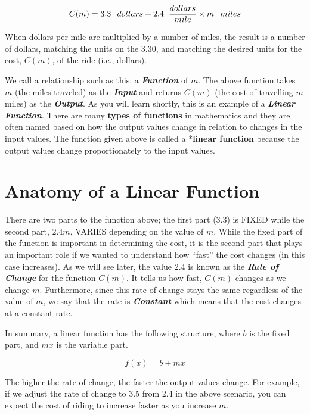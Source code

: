 \documentclass[
  letterpaper,
  DIV=11,
  numbers=noendperiod]{scrreprt}
\begin{document}
\[C(m)=3.3 \hspace{.1in} dollars + 2.4 \hspace{.08in} \frac{dollars}{mile} \times m\hspace{.1in} miles\]

When dollars per mile are multiplied by a number of miles, the result is
a number of dollars, matching the units on the 3.30, and matching the
desired units for the cost, \(C(m)\), of the ride (i.e., dollars).

We call a relationship such as this, a \textbf{\emph{Function}} of
\(m\). The above function takes \(m\) (the miles traveled) as the
\textbf{\emph{Input}} and returns \(C(m)\) (the cost of travelling \(m\)
miles) as the \textbf{\emph{Output}}. As you will learn shortly, this is
an example of a \textbf{\emph{Linear Function}}. There are many
\textbf{types of functions} in mathematics and they are often named
based on how the output values change in relation to changes in the
input values. The function given above is called a *\textbf{linear
function} because the output values change proportionately to the input
values.

\hypertarget{anatomy-of-a-linear-function}{%
\section{Anatomy of a Linear
Function}\label{anatomy-of-a-linear-function}}

There are two parts to the function above; the first part (3.3) is FIXED
while the second part, \(2.4m\), VARIES depending on the value of \(m\).
While the fixed part of the function is important in determining the
cost, it is the second part that plays an important role if we wanted to
understand how ``fast'' the cost changes (in this case increases). As we
will see later, the value \(2.4\) is known as the \textbf{\emph{Rate of
Change}} for the function \(C(m)\). It tells us how fast, \(C(m)\)
changes as we change \(m\). Furthermore, since this rate of change stays
the same regardless of the value of \(m\), we say that the rate is
\textbf{\emph{Constant}} which means that the cost changes at a constant
rate.

In summary, a linear function has the following structure, where \(b\)
is the fixed part, and \(mx\) is the variable part.

\[f(x)=b+mx\]

The higher the rate of change, the faster the output values change. For
example, if we adjust the rate of change to 3.5 from 2.4 in the above
scenario, you can expect the cost of riding to increase faster as you
increase \(m\).
\end{document}
